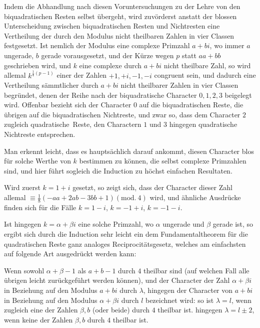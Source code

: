 Indem die Abhandlung nach diesen Voruntersuchungen zu der Lehre von den biquadratischen Resten selbst übergeht, wird zuvörderst anstatt der blossen Unterscheidung zwischen biquadratischen Resten und Nichtresten eine Vertheilung der durch den Modulus nicht theilbaren Zahlen in vier Classen festgesetzt. Ist nemlich der Modulus eine complexe Primzahl $a+bi$, wo immer $a$ ungerade, $b$ gerade vorausgesetzt, und der Kürze wegen $p$ statt $aa+bb$ geschrieben wird, und $k$ eine complexe durch $a+bi$ nicht theilbare Zahl, so wird allemal $k^{\frac14(p-1)}$
%
einer der Zahlen $+1,+i,-1,-i$ congruent sein, und dadurch eine Vertheilung sämmtlicher durch $a+bi$ nicht theilbarer Zahlen in vier Classen begründet, denen der Reihe nach der biquadratische Character $0,1,2,3$ beigelegt wird. Offenbar bezieht sich der Character $0$ auf die biquadratischen Reste, die übrigen auf die biquadratischen Nichtreste, und zwar so, dass dem Character $2$ zugleich quadratische\textperiodcentered\ Reste, den Charactern $1$ und $3$ hingegen quadratische Nichtreste entsprechen.

Man erkennt leicht, dass es hauptsächlich darauf ankommt, diesen Character blos für solche Werthe von $k$ bestimmen zu können, die selbst complexe Primzahlen sind, und hier führt sogleich die Induction zu höchst einfachen Resultaten.

Wird zuerst $k=1+i$ gesetzt, so zeigt sich, dass der Character dieser Zahl allemal $\equiv\frac18(-aa+2ab-3bb+1)(\mathrm{mod.}\ 4)$ wird, und ähnliche Ausdrücke finden sich für die Fälle $k=1-i$, $k=-1+i$, $k=-1-i$.

Ist hingegen $k=\alpha+\beta i$ eine solche Primzahl, wo $\alpha$ ungerade und $\beta$ gerade ist, so ergibt sich durch die Induction sehr leicht ein dem Fundamentaltheorem für die quadratischen Reste ganz analoges Reciprocitätsgesetz, welches am einfachsten auf folgende Art ausgedrückt werden kann:

Wenn sowohl $\alpha+\beta-1$ als $a+b-1$ durch $4$ theilbar sind (auf welchen Fall alle übrigen leicht zurückgeführt werden können), und der Character der Zahl $\alpha+\beta i$ in Beziehung auf den Modulus $a+bi$ durch $\lambda$, hingegen der Character von $a+bi$ in Beziehung auf den Modulus $\alpha+\beta i$ durch $l$ bezeichnet wird: so ist $\lambda=l$, wenn zugleich eine der Zahlen $\beta,b$ (oder beide) durch $4$ theilbar ist. hingegen $\lambda=l\pm2$, wenn keine der Zahlen $\beta,b$ durch $4$ theilbar ist.

